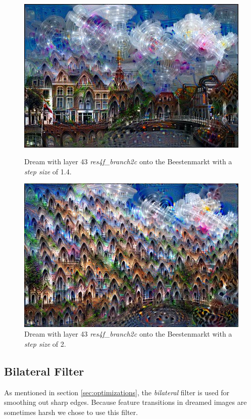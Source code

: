 \begin{figure}[H]
	\centering
	\includegraphics[width=1\linewidth]{img/houses1.jpg}
	\caption{Dream with layer 43 \emph{res4f\_branch2c} onto the Beestenmarkt with a \emph{step size} of 1.4.}
	\label{fig:houses1}
	\endminipage\hfill
	\centering
	\includegraphics[width=1\linewidth]{img/houses2.jpg}
	\caption{Dream with layer 43 \emph{res4f\_branch2c} onto the Beestenmarkt with a \emph{step size} of 2.}
	\label{fig:houses2}
	\endminipage\hfill
\end{figure}

\subsection{Bilateral Filter}
\label{sec:bilateral}

As mentioned in section \ref{sec:optimizations}, the \emph{bilateral} filter is used for smoothing out sharp edges.
Because feature transitions in dreamed images are sometimes harsh we chose to use this filter.

